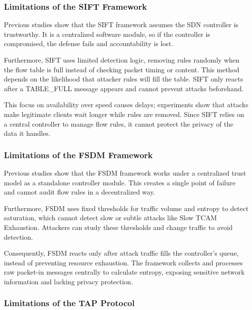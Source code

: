 \documentclass[12pt, a4paper]{report}
\begin{document}
\subsubsection{Limitations of the SIFT Framework}

Previous studies \cite{pascoal2017slow} show that the SIFT framework assumes the SDN controller is trustworthy. It is a centralized software module, so if the controller is compromised, the defense fails and accountability is lost.

Furthermore, SIFT uses limited detection logic, removing rules randomly when the flow table is full instead of checking packet timing or content. This method depends on the likelihood that attacker rules will fill the table. SIFT only reacts after a TABLE\_FULL message appears and cannot prevent attacks beforehand.

This focus on availability over speed causes delays; experiments show that attacks make legitimate clients wait longer while rules are removed. Since SIFT relies on a central controller to manage flow rules, it cannot protect the privacy of the data it handles.

\subsubsection{Limitations of the FSDM Framework}

Previous studies \cite{9356082} show that the FSDM framework works under a centralized trust model as a standalone controller module. This creates a single point of failure and cannot audit flow rules in a decentralized way.

Furthermore, FSDM uses fixed thresholds for traffic volume and entropy to detect saturation, which cannot detect slow or subtle attacks like Slow TCAM Exhaustion. Attackers can study these thresholds and change traffic to avoid detection.

Consequently, FSDM reacts only after attack traffic fills the controller's queue, instead of preventing resource exhaustion. The framework collects and processes raw packet-in messages centrally to calculate entropy, exposing sensitive network information and lacking privacy protection.

\subsubsection{Limitations of the TAP Protocol}
\end{document}
